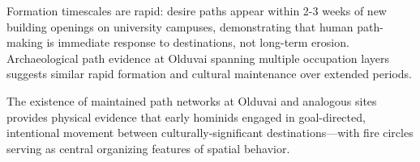 Formation timescales are rapid: desire paths appear within 2-3 weeks of new building openings on university campuses, demonstrating that human path-making is immediate response to destinations, not long-term erosion. Archaeological path evidence at Olduvai spanning multiple occupation layers suggests similar rapid formation and cultural maintenance over extended periods.

The existence of maintained path networks at Olduvai and analogous sites provides physical evidence that early hominids engaged in goal-directed, intentional movement between culturally-significant destinations—with fire circles serving as central organizing features of spatial behavior.
